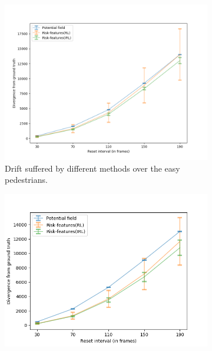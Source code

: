 %
\begin{figure}[htbp]
	\begin{subfigure}{0.5\textwidth}
		\centering
		\includegraphics[width=\linewidth]{plots/plot_without_outliers/ucy_inter_method_no_outlier/drift_analysis_easy_no_outliers.png}
		\caption{Drift suffered by different methods over the easy pedestrians.}
		\label{fig:inter_method-drift_analysis_easy}
	\end{subfigure}
	\begin{subfigure}{0.5\textwidth}
		\centering
		\includegraphics[width=\linewidth]{plots/plot_without_outliers/ucy_inter_method_no_outlier/drift_analysis_med_no_outliers.png}

\end{subfigure}
\end{figure}
